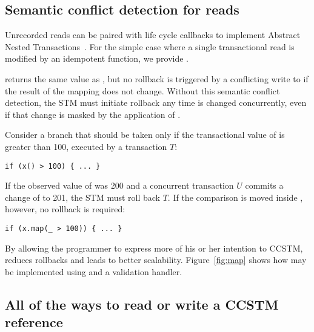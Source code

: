 \subsection{Semantic conflict detection for reads}
\label{sec:map}

Unrecorded reads can be paired with life cycle callbacks to implement
Abstract Nested Transactions~\cite{harris07abstract}.  For the simple case where
a single transactional read is modified by an idempotent function, we provide
\code{map[}\code{](f: }\code{ => }\code{): }.

 returns the same value as , but no rollback
is triggered by a conflicting write to  if the result of the mapping
does not change.  Without this
semantic conflict detection, the STM must initiate rollback any time 
is changed concurrently, even if that change is masked by the application of
.

Consider a branch that should be taken only if the transactional value of
 is greater than 100, executed by a transaction $T$:
\lstset{numbers=none}
\begin{lstlisting}
if (x() > 100) { ... }
\end{lstlisting}
\lstset{numbers=left}
If the observed value of  was 200 and a concurrent transaction $U$ commits
a change of  to 201, the STM must roll back $T$.  If the comparison is
moved inside , however, no rollback is required:
\lstset{numbers=none}
\begin{lstlisting}
if (x.map(_ > 100)) { ... }
\end{lstlisting}
\lstset{numbers=left}
By allowing the programmer to express more of his or her intention to CCSTM,
 reduces rollbacks and leads to better scalability.
Figure~\ref{fig:map} shows how  may be implemented using
 and a validation handler.



\subsection{All of the ways to read or write a CCSTM reference}

